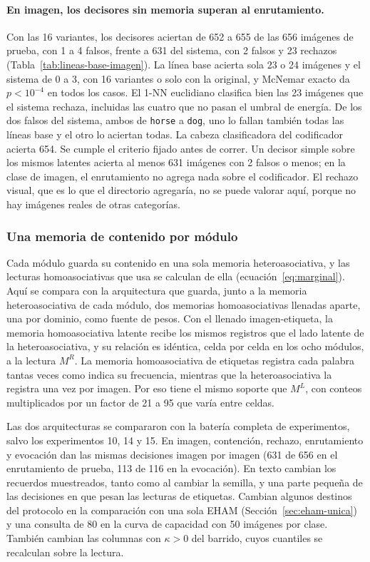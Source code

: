 \paragraph{En imagen, los decisores sin memoria superan al enrutamiento.}
Con las 16 variantes, los decisores aciertan de 652 a 655 de las 656 imágenes de prueba,
con 1 a 4 falsos, frente a 631 del sistema, con 2 falsos y 23 rechazos
(Tabla~\ref{tab:lineas-base-imagen}).
La línea base acierta sola 23 o 24 imágenes y el sistema de 0 a 3, con 16 variantes o
solo con la original, y McNemar exacto da $p < 10^{-4}$ en todos los casos.
El 1-NN euclidiano clasifica bien las 23 imágenes que el sistema rechaza, incluidas las
cuatro que no pasan el umbral de energía.
De los dos falsos del sistema, ambos de \texttt{horse} a \texttt{dog}, uno lo fallan
también todas las líneas base y el otro lo aciertan todas.
La cabeza clasificadora del codificador acierta 654.
Se cumple el criterio fijado antes de correr.
Un decisor simple sobre los mismos latentes acierta al menos 631 imágenes con 2 falsos o
menos; en la clase de imagen, el enrutamiento no agrega nada sobre el codificador.
El rechazo visual, que es lo que el directorio agregaría, no se puede valorar aquí,
porque no hay imágenes reales de otras categorías.

\subsubsection{Una memoria de contenido por módulo}
\label{sec:una-memoria}

Cada módulo guarda su contenido en una sola memoria heteroasociativa, y las lecturas
homoasociativas que usa se calculan de ella (ecuación~\eqref{eq:marginal}).
Aquí se compara con la arquitectura que guarda, junto a la memoria
heteroasociativa de cada módulo, dos memorias homoasociativas llenadas aparte, una por
dominio, como fuente de pesos.
Con el llenado imagen-etiqueta, la memoria homoasociativa latente recibe los mismos
registros que el lado latente de la heteroasociativa, y su relación es idéntica, celda
por celda en los ocho módulos, a la lectura $M^{R}$.
La memoria homoasociativa de etiquetas registra cada palabra tantas veces como indica
su frecuencia, mientras que la heteroasociativa la registra una vez por imagen.
Por eso tiene el mismo soporte que $M^{L}$, con conteos multiplicados por un factor de
21 a 95 que varía entre celdas.

Las dos arquitecturas se compararon con la batería completa de experimentos, salvo los
experimentos 10, 14 y 15.
En imagen, contención, rechazo, enrutamiento y evocación dan las mismas decisiones
imagen por imagen (631 de 656 en el enrutamiento de prueba, 113 de 116 en la evocación).
En texto cambian los recuerdos muestreados, tanto como al cambiar la semilla, y una
parte pequeña de las decisiones en que pesan las lecturas de etiquetas.
Cambian algunos destinos del protocolo en la comparación con una sola EHAM
(Sección~\ref{sec:eham-unica}) y una consulta de 80 en la curva de capacidad con 50
imágenes por clase.
También cambian las columnas con $\kappa > 0$ del barrido, cuyos cuantiles se
recalculan sobre la lectura.


